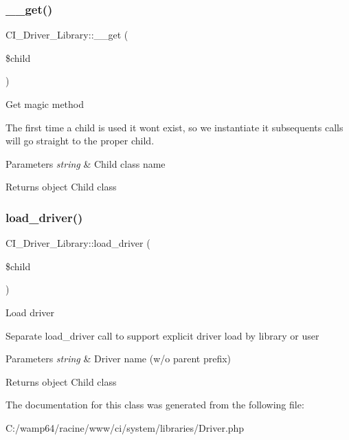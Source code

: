 \subsubsection{\texorpdfstring{\+\_\+\+\_\+get()}{\_\_get()}}
{\footnotesize\ttfamily C\+I\+\_\+\+Driver\+\_\+\+Library\+::\+\_\+\+\_\+get (\begin{DoxyParamCaption}\item[{}]{\$child }\end{DoxyParamCaption})}

Get magic method

The first time a child is used it won\textquotesingle{}t exist, so we instantiate it subsequents calls will go straight to the proper child.


\begin{DoxyParams}{Parameters}
{\em string} & Child class name \\
\hline
\end{DoxyParams}
\begin{DoxyReturn}{Returns}
object Child class 
\end{DoxyReturn}
\mbox{\label{class_c_i___driver___library_a99e23bfb3eae32c0f4b30243499fa655}} 
\subsubsection{\texorpdfstring{load\+\_\+driver()}{load\_driver()}}
{\footnotesize\ttfamily C\+I\+\_\+\+Driver\+\_\+\+Library\+::load\+\_\+driver (\begin{DoxyParamCaption}\item[{}]{\$child }\end{DoxyParamCaption})}

Load driver

Separate load\+\_\+driver call to support explicit driver load by library or user


\begin{DoxyParams}{Parameters}
{\em string} & Driver name (w/o parent prefix) \\
\hline
\end{DoxyParams}
\begin{DoxyReturn}{Returns}
object Child class 
\end{DoxyReturn}


The documentation for this class was generated from the following file\+:\begin{DoxyCompactItemize}
\item 
C\+:/wamp64/racine/www/ci/system/libraries/Driver.\+php\end{DoxyCompactItemize}
